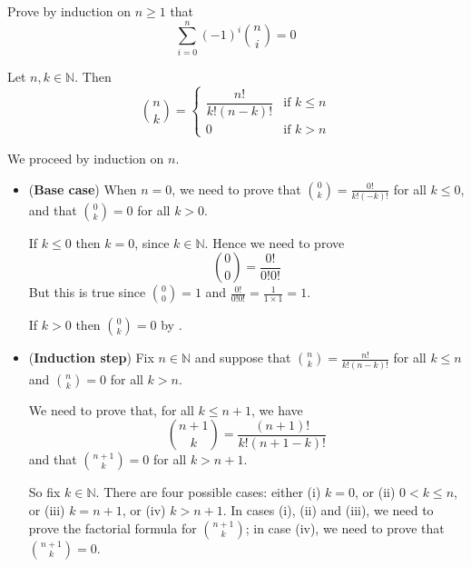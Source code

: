 \begin{exercise}
\label{exAlternatingSumOfBinomialCoefficientsIsZero}
Prove by induction on $n \ge 1$ that
\[ \sum_{i=0}^n (-1)^i \binom{n}{i} = 0 \]
\end{exercise}

\begin{theorem}
\label{thmBinomAsFactorialByInduction}
Let $n,k \in \mathbb{N}$. Then
\[ \binom{n}{k} =
\begin{cases}
\dfrac{n!}{k!(n-k)!} & \text{if } k \le n \\
0 & \text{if } k > n
\end{cases} \]
\end{theorem}
\begin{cproof}
We proceed by induction on $n$.
\begin{itemize}
\item (\textbf{Base case}) When $n=0$, we need to prove that $\binom{0}{k} = \frac{0!}{k!(-k)!}$ for all $k \le 0$, and that $\binom{0}{k} = 0$ for all $k>0$.

If $k \le 0$ then $k=0$, since $k \in \mathbb{N}$. Hence we need to prove
\[ \binom{0}{0} = \frac{0!}{0!0!} \]
But this is true since $\binom{0}{0}=1$ and $\frac{0!}{0!0!} = \frac{1}{1 \times 1} = 1$.

If $k>0$ then $\binom{0}{k} = 0$ by .
\item (\textbf{Induction step}) Fix $n \in \mathbb{N}$ and suppose that $\binom{n}{k} = \frac{n!}{k!(n-k)!}$ for all $k \le n$ and $\binom{n}{k} = 0$ for all $k > n$.

We need to prove that, for all $k \le n+1$, we have
\[ \binom{n+1}{k} = \frac{(n+1)!}{k!(n+1-k)!} \]
and that $\binom{n+1}{k} = 0$ for all $k > n+1$.

So fix $k \in \mathbb{N}$. There are four possible cases: either (i) $k=0$, or (ii) $0 < k \le n$, or (iii) $k=n+1$, or (iv) $k>n+1$. In cases (i), (ii) and (iii), we need to prove the factorial formula for $\binom{n+1}{k}$; in case (iv), we need to prove that $\binom{n+1}{k} = 0$.


\end{itemize}
\end{cproof}
